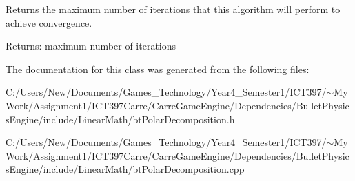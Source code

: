 Returns the maximum number of iterations that this algorithm will perform to achieve convergence.

\begin{Desc}
\item[Returns:]maximum number of iterations \end{Desc}


The documentation for this class was generated from the following files:\begin{CompactItemize}
\item 
C:/Users/New/Documents/Games\_\-Technology/Year4\_\-Semester1/ICT397/$\sim$My Work/Assignment1/ICT397Carre/CarreGameEngine/Dependencies/BulletPhysicsEngine/include/LinearMath/btPolarDecomposition.h\item 
C:/Users/New/Documents/Games\_\-Technology/Year4\_\-Semester1/ICT397/$\sim$My Work/Assignment1/ICT397Carre/CarreGameEngine/Dependencies/BulletPhysicsEngine/include/LinearMath/btPolarDecomposition.cpp\end{CompactItemize}

